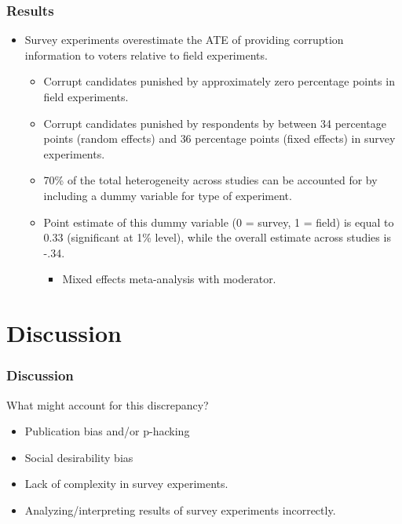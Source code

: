 \documentclass[usenames,dvipsnames]{beamer}
\begin{document}

\begin{frame}
\frametitle{Results}
\begin{itemize}
\item Survey experiments overestimate the ATE of providing corruption information to voters relative to field experiments.
\pause
\begin{itemize}
\item Corrupt candidates punished by approximately \textcolor{Cerulean}{zero percentage points} in field experiments.
\pause
\item Corrupt candidates punished by respondents by between \textcolor{Cerulean}{34 percentage points} (random effects) and \textcolor{Cerulean}{36 percentage points} (fixed effects) in survey experiments.
\pause
\item 70\% of the total heterogeneity across studies can be accounted for by including a dummy variable for type of experiment.
\pause
\item Point estimate of this dummy variable (0 = survey, 1 = field) is equal to 0.33 (significant at 1\% level), while the overall estimate across studies is -.34. 
\begin{itemize}
\item Mixed effects meta-analysis with moderator. 
\end{itemize}
\end{itemize}
\end{itemize}
\end{frame}

\section{Discussion}

\begin{frame}
\frametitle{Discussion}
What might account for this discrepancy?
\pause
\begin{itemize}
\item Publication bias and/or p-hacking
\pause
\item Social desirability bias
\pause
\item Lack of complexity in survey experiments.
\pause
\item Analyzing/interpreting results of survey experiments incorrectly. 
\end{itemize}

\end{frame}
\end{document}
